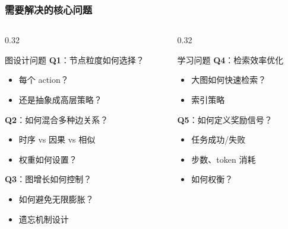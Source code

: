 \documentclass[aspectratio=169,10pt]{beamer}
\begin{document}
\begin{frame}
  \frametitle{需要解决的核心问题}

  \begin{columns}[T]
    \begin{column}{0.32\textwidth}
      \begin{block}{图设计问题}
        \footnotesize
        \textbf{Q1}：节点粒度如何选择？
        \begin{itemize}
          \item 每个 action？
          \item 还是抽象成高层策略？
        \end{itemize}

        \vspace{0.2cm}

        \textbf{Q2}：如何混合多种边关系？
        \begin{itemize}
          \item 时序 vs 因果 vs 相似
          \item 权重如何设置？
        \end{itemize}

        \vspace{0.2cm}

        \textbf{Q3}：图增长如何控制？
        \begin{itemize}
          \item 如何避免无限膨胀？
          \item 遗忘机制设计
        \end{itemize}
      \end{block}
    \end{column}

    \begin{column}{0.32\textwidth}
      \begin{block}{学习问题}
        \footnotesize
        \textbf{Q4}：检索效率优化
        \begin{itemize}
          \item 大图如何快速检索？
          \item 索引策略
        \end{itemize}

        \vspace{0.2cm}

        \textbf{Q5}：如何定义奖励信号？
        \begin{itemize}
          \item 任务成功/失败
          \item 步数、token 消耗
          \item 如何权衡？
        \end{itemize}


\end{block}
\end{column}
\end{columns}
\end{frame}
\end{document}
